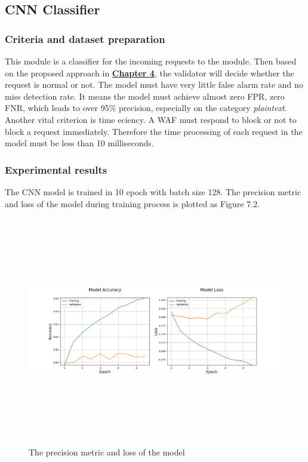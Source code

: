 \subsection{CNN Classifier}
\subsubsection{Criteria and dataset preparation}
\hspace{0.5cm}This module is a classifier for the incoming requests to the module. Then based on the proposed approach in \hyperref[chap:proposed_approaches]{\textbf{Chapter 4}}, the validator will decide whether the request is normal or not. The model must have very little false alarm rate and no miss detection rate. It means the model must achieve almost zero FPR, zero FNR, which leads to over 95\% precision, especially on the category \textit{plaintext}. Another vital criterion is time eciency. A WAF must respond to block or not to block a request immediately. Therefore the time processing of each request in the model must be less than 10 milliseconds. 
\subsubsection{Experimental results}
\hspace{0.5cm}The CNN model is trained in 10 epoch with batch size 128. The precision metric and loss of the model during training process is plotted as Figure 7.2.
       
\begin{figure}[!h]
	\centering
	\includegraphics[width=\linewidth, height=10cm,keepaspectratio]{figures/metric and loss.png}
  \caption{The precision metric and loss of the model}  
\end{figure} 


